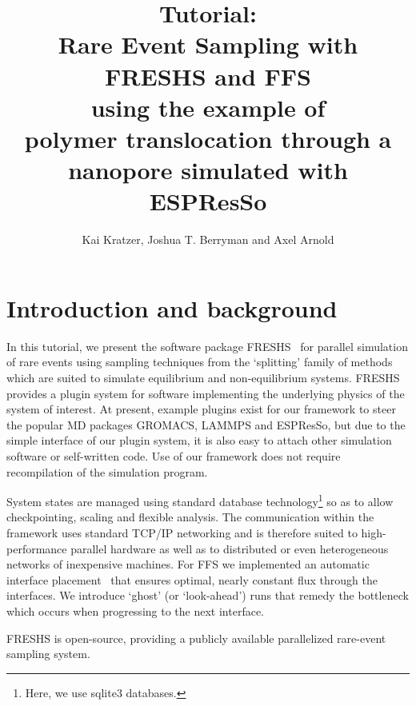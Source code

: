 \documentclass[a4paper,oneside]{article}
\title{Tutorial:\\Rare Event Sampling with FRESHS and FFS\\using the example of\\polymer translocation through a nanopore simulated with ESPResSo}
\author{Kai Kratzer, Joshua T. Berryman and Axel Arnold}
\begin{document}

\maketitle
\tableofcontents

\newpage

\section{Introduction and background}

In this tutorial, we present the software package FRESHS~\cite{freshs} for parallel simulation of rare events using sampling techniques from the `splitting' family of methods which are suited to simulate equilibrium and non-equilibrium systems.
FRESHS provides a plugin system for software implementing the underlying physics of the system of interest. At present, example plugins exist for our framework to steer the popular MD packages GROMACS, LAMMPS and ESPResSo, but due to the simple interface of our plugin system, it is also easy to attach other simulation software or self-written code. Use of our framework does not require recompilation of the simulation program.

System states are managed using standard database technology\footnote{Here, we use sqlite3 databases.} so as to allow checkpointing, scaling and flexible analysis.
The communication within the framework uses standard TCP/IP networking and is therefore suited to high-performance parallel hardware as well as to distributed or even heterogeneous networks of inexpensive machines. 
For FFS we implemented an automatic interface placement~\cite{optiflux} that ensures optimal, nearly constant flux through the interfaces.
We introduce `ghost' (or `look-ahead') runs that remedy the bottleneck which occurs when progressing to the next interface.

FRESHS is open-source, providing a publicly available parallelized rare-event sampling system.
\end{document}
